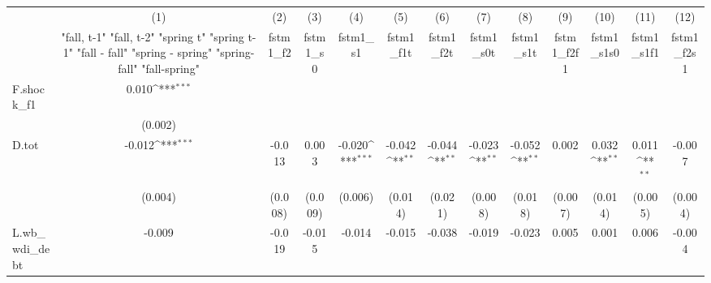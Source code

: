{
\def\sym#1{\ifmmode^{#1}\else\(^{#1}\)\fi}
\begin{tabular}{l*{12}{c}}
\toprule
            &\multicolumn{1}{c}{(1)}&\multicolumn{1}{c}{(2)}&\multicolumn{1}{c}{(3)}&\multicolumn{1}{c}{(4)}&\multicolumn{1}{c}{(5)}&\multicolumn{1}{c}{(6)}&\multicolumn{1}{c}{(7)}&\multicolumn{1}{c}{(8)}&\multicolumn{1}{c}{(9)}&\multicolumn{1}{c}{(10)}&\multicolumn{1}{c}{(11)}&\multicolumn{1}{c}{(12)}\\
            &\multicolumn{1}{c}{  "fall, t-1" "fall, t-2" "spring t" "spring t-1"  "fall - fall" "spring - spring" "spring-fall" "fall-spring" }&\multicolumn{1}{c}{fstm1\_f2}&\multicolumn{1}{c}{fstm1\_s0}&\multicolumn{1}{c}{fstm1\_s1}&\multicolumn{1}{c}{fstm1\_f1t}&\multicolumn{1}{c}{fstm1\_f2t}&\multicolumn{1}{c}{fstm1\_s0t}&\multicolumn{1}{c}{fstm1\_s1t}&\multicolumn{1}{c}{fstm1\_f2f1}&\multicolumn{1}{c}{fstm1\_s1s0}&\multicolumn{1}{c}{fstm1\_s1f1}&\multicolumn{1}{c}{fstm1\_f2s1}\\
\midrule
F.shock\_f1  &       0.010\sym{***}&                     &                     &                     &                     &                     &                     &                     &                     &                     &                     &                     \\
            &     (0.002)         &                     &                     &                     &                     &                     &                     &                     &                     &                     &                     &                     \\
\addlinespace
D.tot       &      -0.012\sym{***}&      -0.013         &       0.003         &      -0.020\sym{***}&      -0.042\sym{**} &      -0.044\sym{**} &      -0.023\sym{**} &      -0.052\sym{**} &       0.002         &       0.032\sym{**} &       0.011\sym{**} &      -0.007         \\
            &     (0.004)         &     (0.008)         &     (0.009)         &     (0.006)         &     (0.014)         &     (0.021)         &     (0.008)         &     (0.018)         &     (0.007)         &     (0.014)         &     (0.005)         &     (0.004)         \\
\addlinespace
L.wb\_wdi\_debt&      -0.009         &      -0.019         &      -0.015         &      -0.014         &      -0.015         &      -0.038         &      -0.019         &      -0.023         &       0.005         &       0.001         &       0.006         &      -0.004         \\

\end{tabular}}
